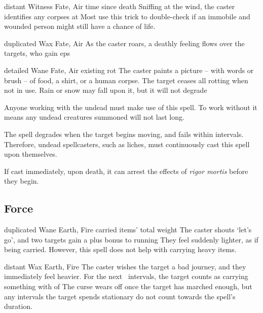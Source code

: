 \begin{multicols}{2}

  {distant}%
  {Witness}%
  {Fate, Air}%
  {time since death}%
  {Sniffing at the wind, the caster identifies any corpses at \spellRange}%
  {Most use this trick to double-check if an immobile and wounded person might still have a chance of life.}

  {duplicated}%
  {Wax}%
  {Fate, Air}%
  {}%
  {As the caster roars, a deathly feeling flows over the targets, who gain  \glspl{ep}}%
  {}

  {detailed}%
  {Wane}%
  {Fate, Air}%
  {existing rot}%
  {The caster paints a picture -- with words or brush -- of food, a shirt, or a human corpse.
  The target ceases all rotting when not in use.
  Rain or snow may fall upon it, but it will not degrade}%
  {
    Anyone working with the undead must make use of this spell.
    To work without it means any undead creatures summoned will not last long.

    The spell degrades when the target begins moving, and fails within  \glspl{interval}.
    Therefore, undead spellcasters, such as liches, must continuously cast this spell upon themselves.

    If cast immediately, upon death, it can arrest the effects of \textit{rigor mortis} before they begin.
  }

\subsection{Force}


  {duplicated}%
  {Wane}%
  {Earth, Fire}%
  {carried items' total \gls{weight}}%
  {The caster shouts `let's go', and two targets gain a plus  bonus to running}%
  {They feel suddenly lighter, as if being carried.
  However, this spell does not help with carrying heavy items.}

  {distant}%
  {Wax}%
  {Earth, Fire}%
  {}%
  {The caster wishes the target a bad journey, and they immediately feel heavier.
  For the next ~\glspl{interval}, the target counts as carrying something with  of }%
  {
  The curse wears off once the target has marched enough, but any \glspl{interval} the target spends stationary do not count towards the spell's duration.}


\end{multicols}
